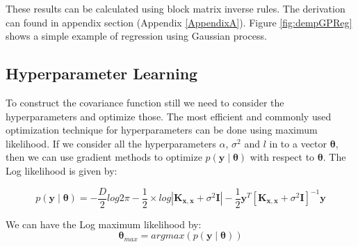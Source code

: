 These results can be calculated using block matrix inverse rules. The derivation can found in appendix section (Appendix \ref{AppendixA}). Figure \ref{fig:dempGPReg} shows a simple example of regression
using Gaussian process.

\subsection{Hyperparameter Learning}
To construct the covariance function still we need to consider the hyperparameters and optimize those. The most efficient and commonly used optimization technique for hyperparameters can be done using maximum likelihood. If we consider all the hyperparameters $\alpha$, $\sigma^2$ and $l$ in to a vector $\boldsymbol{\theta}$, then we can use gradient methods to optimize $p \left(\mathbf{y}\middle|\boldsymbol{\theta}\right)$ with respect to $\boldsymbol{\theta}$. The Log likelihood is given by:

\begin{equation} \label{eq:Likelihood}
 p \left(\mathbf{y}\middle|\boldsymbol{\theta}\right) =
    - \frac{D}{2}log2\pi - \frac{1}{2}\times log \left| \mathbf{K_{x,x}} + \sigma^2\mathbf{I}\right|
    - \frac{1}{2}\mathbf{y}^T \left[\mathbf{K_{x,x}} + \sigma^2\mathbf{I} \right]^{-1}\mathbf{y}
\end{equation}

We can have the Log maximum likelihood by:
\begin{equation} \label{eq:LML}
 \boldsymbol{\theta}_{max} = argmax \left( p\left(\mathbf{y}\middle|\boldsymbol{\theta}\right) \right)
\end{equation}



